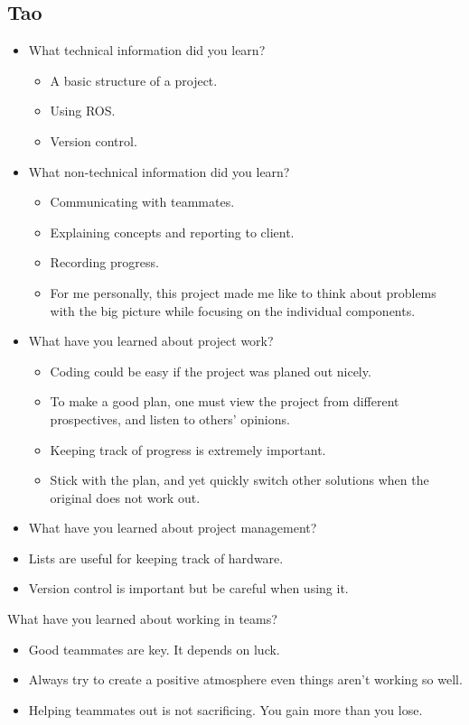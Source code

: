 \documentclass[compsoc,draftclsnofoot,onecolumn,10pt]{IEEEtran}
\begin{document}
\subsection{Tao}
\begin{itemize}
    \item What technical information did you learn?
    \begin{itemize}
      \item A basic structure of a project.
      \item Using ROS.
      \item Version control.
    \end{itemize}
    \item What non-technical information did you learn?
    \begin{itemize}
      \item Communicating with teammates.
      \item Explaining concepts and reporting to client.
      \item Recording progress.
      \item For me personally, this project made me like to think about
      problems with the big picture while focusing on the individual components.
    \end{itemize}
    \item What have you learned about project work?
    \begin{itemize}
      \item Coding could be easy if the project was planed out nicely.
      \item To make a good plan, one must view the project from different
      prospectives, and listen to others' opinions.
      \item Keeping track of progress is extremely important.
      \item Stick with the plan, and yet quickly switch other solutions
      when the original does not work out.
    \end{itemize}
    \item What have you learned about project management?
        \item Lists are useful for keeping track of hardware.
        \item Version control is important but be careful when using it.
      \end{itemize}
    \item What have you learned about working in teams?
    \begin{itemize}
      \item Good teammates are key. It depends on luck.
      \item Always try to create a positive atmosphere even things aren't
      working so well.
      \item Helping teammates out is not sacrificing. You gain more than you
      lose.
    \end{itemize}
\end{document}
